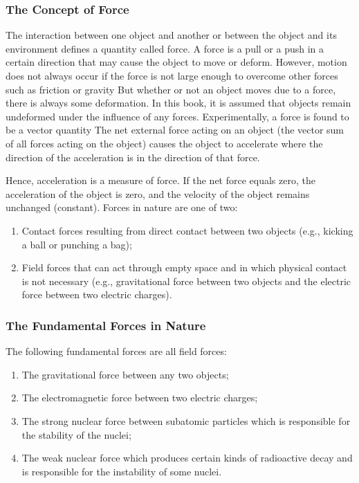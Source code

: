 \documentclass[10pt]{article}
\numberwithin{equation}{section}
\begin{document}
\subsubsection{The Concept of Force}\label{sec:3-1-1}
The interaction between one object and another or between the object and its environment defines a quantity called force. A force is a pull or a push in a certain direction that may cause the object to move or deform. However, motion does not always occur if the force is not large enough to overcome other forces such as friction or gravity But whether or not an object moves due to a force, there is always some deformation. In this book, it is assumed that objects remain undeformed under the influence of any forces. Experimentally, a force is found to be a vector quantity The net external force acting on an object (the vector sum of all forces acting on the object) causes the object to accelerate where the direction of the acceleration is in the direction of that force.

Hence, acceleration is a measure of force. If the net force equals zero, the acceleration of the object is zero, and the velocity of the object remains unchanged (constant). Forces in nature are one of two:

\begin{enumerate}
  \item Contact forces resulting from direct contact between two objects (e.g., kicking a ball or punching a bag);
  \item Field forces that can act through empty space and in which physical contact is not necessary (e.g., gravitational force between two objects and the electric force between two electric charges).
\end{enumerate}

\subsubsection{The Fundamental Forces in Nature}\label{sec:3-1-2}
The following fundamental forces are all field forces:

\begin{enumerate}
  \item The gravitational force between any two objects;
  \item The electromagnetic force between two electric charges;
  \item The strong nuclear force between subatomic particles which is responsible for the stability of the nuclei;
  \item The weak nuclear force which produces certain kinds of radioactive decay and is responsible for the instability of some nuclei.
\end{enumerate}
\end{document}
